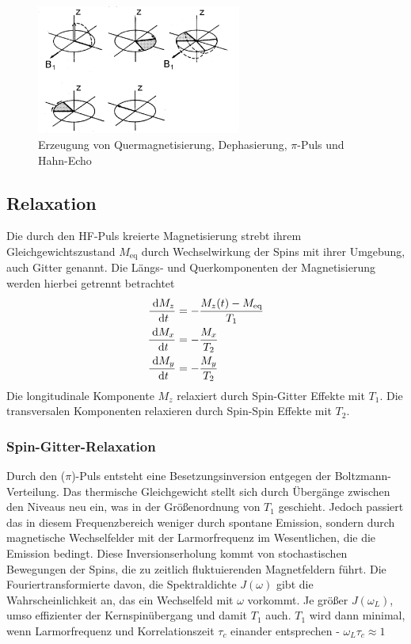 \begin{figure}[t]
 \includegraphics[width=0.6\textwidth]{../pics/rephasierung.jpg}
 \caption{Erzeugung von Quermagnetisierung, Dephasierung, $\pi$-Puls und Hahn-Echo}
 \label{pic_rephasierung}
\end{figure}

\subsection{Relaxation}
Die durch den HF-Puls kreierte Magnetisierung strebt ihrem Gleichgewichtszustand $M_\text{eq}$ durch Wechselwirkung der Spins mit ihrer Umgebung, auch
Gitter genannt. Die Längs- und Querkomponenten der Magnetisierung werden hierbei getrennt betrachtet
\begin{align}
 \frac{\; \mathrm{d} M_z}{\; \mathrm{d} t} &= -\frac{M_z(t) - M_\text{eq}}{T_1}\\
 \frac{\; \mathrm{d} M_x}{\; \mathrm{d} t} &= -\frac{M_x}{T_2}\\
 \frac{\; \mathrm{d} M_y}{\; \mathrm{d} t} &= -\frac{M_y}{T_2}
\end{align}
\noindent
Die longitudinale Komponente $M_z$ relaxiert durch Spin-Gitter Effekte mit $T_1$. Die transversalen Komponenten relaxieren durch Spin-Spin Effekte mit
$T_2$.

\subsubsection{Spin-Gitter-Relaxation}
Durch den ($\pi$)-Puls entsteht eine Besetzungsinversion entgegen der Boltzmann-Verteilung. Das thermische Gleichgewicht stellt sich durch Übergänge zwischen
den Niveaus neu ein, was in der Größenordnung von $T_1$ geschieht. Jedoch passiert das in diesem Frequenzbereich weniger durch spontane Emission, sondern durch 
magnetische Wechselfelder mit der Larmorfrequenz im Wesentlichen, die die Emission bedingt. Diese Inversionserholung kommt von stochastischen Bewegungen
der Spins, die zu zeitlich fluktuierenden Magnetfeldern führt. Die Fouriertransformierte davon, die Spektraldichte $J(\omega)$ gibt die Wahrscheinlichkeit an,
das ein Wechselfeld mit $\omega$ vorkommt. Je größer $J(\omega_L)$, umso effizienter der Kernspinübergang und damit $T_1$ auch. $T_1$ wird dann minimal, 
wenn Larmorfrequenz und Korrelationszeit $\tau_c$ einander entsprechen - $\omega_L \tau_c \approx 1$

